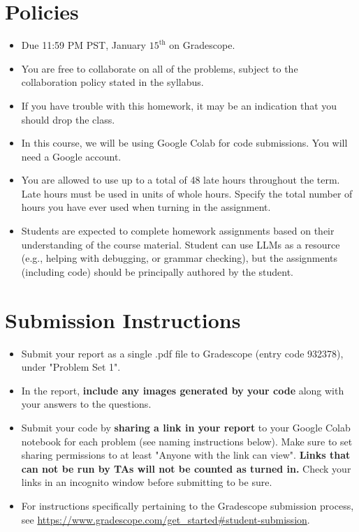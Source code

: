 \documentclass{article}
\begin{document}
\pagestyle{fancy}




\section*{Policies}
\begin{itemize}
	\item Due 11:59 PM PST, January $15^\text{th}$ on Gradescope. 
	\item You are free to collaborate on all of the problems, subject to the collaboration policy stated in the syllabus.
	\item If you have trouble with this homework, it may be an indication that you should drop the class.
	\item In this course, we will be using Google Colab for code submissions. You will need a Google account.
  \item You are allowed to use up to a total of 48 late hours throughout the term. Late hours must be used in units of whole hours. Specify the total number of hours you have ever used when turning in the assignment.
  \item Students are expected to complete homework assignments based on their understanding of the course material. Student can use LLMs as a resource (e.g., helping with debugging, or grammar checking), but the assignments (including code) should be principally authored by the student.
\end{itemize}

\section*{Submission Instructions}

\begin{itemize}
	\item Submit your report as a single .pdf file to Gradescope (entry code 932378), under "Problem Set 1". 
	\item In the report, \textbf{include any images generated by your code} along with your answers to the questions.
	\item Submit your code by \textbf{sharing a link in your report} to your Google Colab notebook for each problem (see naming instructions below). Make sure to set sharing permissions to at least "Anyone with the link can view". \textbf{Links that can not be run by TAs will not be counted as turned in.} Check your links in an incognito window before submitting to be sure. 
	\item For instructions specifically pertaining to the Gradescope submission process, see \url{https://www.gradescope.com/get_started#student-submission}.
	
\end{itemize}
\end{document}
